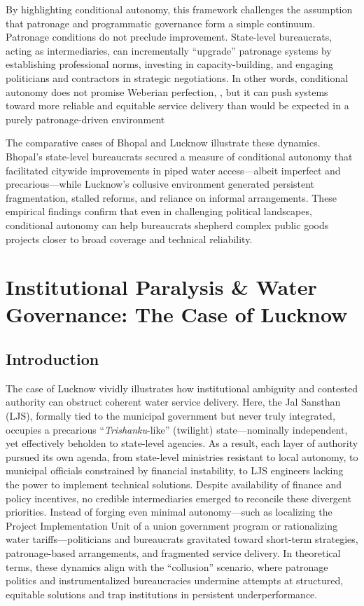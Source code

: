 By highlighting conditional autonomy, this framework challenges the assumption that patronage and programmatic governance form a simple continuum. Patronage conditions do not preclude improvement. State-level bureaucrats, acting as intermediaries, can incrementally “upgrade” patronage systems by establishing professional norms, investing in capacity-building, and engaging politicians and contractors in strategic negotiations. In other words, conditional autonomy does not promise Weberian perfection, , but it can push systems toward more reliable and equitable service delivery than would be expected in a purely patronage-driven environment

The comparative cases of Bhopal and Lucknow illustrate these dynamics. Bhopal’s state-level bureaucrats secured a measure of conditional autonomy that facilitated citywide improvements in piped water access—albeit imperfect and precarious—while Lucknow’s collusive environment generated persistent fragmentation, stalled reforms, and reliance on informal arrangements. These empirical findings confirm that even in challenging political landscapes, conditional autonomy can help bureaucrats shepherd complex public goods projects closer to broad coverage and technical reliability.




\section{Institutional Paralysis \& Water Governance: The Case of Lucknow}

\subsection{Introduction}
The case of Lucknow vividly illustrates how institutional ambiguity and contested authority can obstruct coherent water service delivery. Here, the Jal Sansthan (LJS), formally tied to the municipal government but never truly integrated, occupies a precarious “\textit{Trishanku}-like” (twilight) state—nominally independent, yet effectively beholden to state-level agencies. As a result, each layer of authority pursued its own agenda, from state-level ministries resistant to local autonomy, to municipal officials constrained by financial instability, to LJS engineers lacking the power to implement technical solutions. Despite availability of finance and policy incentives, no credible intermediaries emerged to reconcile these divergent priorities. Instead of forging even minimal autonomy—such as localizing the Project Implementation Unit of a union government program or rationalizing water tariffs—politicians and bureaucrats gravitated toward short-term strategies, patronage-based arrangements, and fragmented service delivery. In theoretical terms, these dynamics align with the “collusion” scenario, where patronage politics and instrumentalized bureaucracies undermine attempts at structured, equitable solutions and trap institutions in persistent underperformance.


